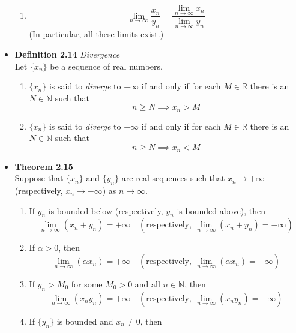 \documentclass[11pt,a4paper]{article}
\begin{document}
\begin{itemize}
\begin{enumerate}
            \item
                \[
                    \lim_{n \to \infty} \frac{x_n}{y_n} =
                    \frac{\lim_{n \to \infty} x_n}{\lim_{n \to \infty} y_n}
                \]
                (In particular, all these limits exist.)
        \end{enumerate}
    \item \textbf{Definition 2.14} \emph{Divergence} \\
        Let $\{x_n\}$ be a sequence of real numbers.
        \begin{enumerate}
            \item $\{x_n\}$ is said to \emph{diverge} to $+\infty$ if and only if for each
                $M \in \mathbb{R}$ there is an $N \in \mathbb{N}$ such that
                \[
                    n \geq N \implies x_n > M
                \]
            \item $\{x_n\}$ is said to \emph{diverge} to $-\infty$ if and only if for each
                $M \in \mathbb{R}$ there is an $N \in \mathbb{N}$ such that
                \[
                    n \geq N \implies x_n < M
                \]
        \end{enumerate}
    \item \textbf{Theorem 2.15} \\
        Suppose that $\{x_n\}$ and $\{y_n\}$ are real sequences such that $x_n \to +\infty$
        (respectively, $x_n \to -\infty$) as $n \to \infty$.
        \begin{enumerate}
            \item If $y_n$ is bounded below (respectively, $y_n$ is bounded above), then
                \[
                    \lim_{n \to \infty} (x_n + y_n) = +\infty \quad
                    (\text{respectively}, \ \lim_{n \to \infty} (x_n + y_n) = -\infty)
                \]
            \item If $\alpha > 0$, then
                \[
                    \lim_{n \to \infty} (\alpha x_n) = +\infty \quad
                    (\text{respectively}, \ \lim_{n \to \infty} (\alpha x_n) = -\infty)
                \]
            \item If $y_n > M_0$ for some $M_0 > 0$ and all $n \in \mathbb{N}$, then
                \[
                    \lim_{n \to \infty} (x_n y_n) = +\infty \quad
                    (\text{respectively}, \ \lim_{n \to \infty} (x_n y_n) = -\infty)
                \]
            \item If $\{y_n\}$ is bounded and $x_n \neq 0$, then

\end{enumerate}
\end{itemize}
\end{document}
